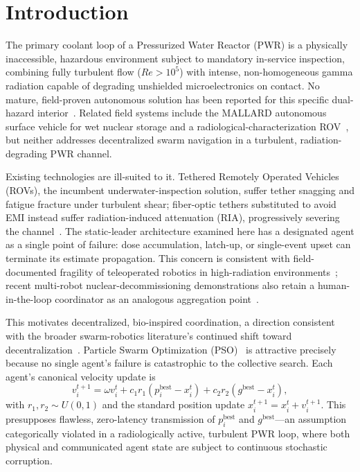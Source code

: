 \documentclass[conference]{IEEEtran}
\begin{document}
\section{Introduction}
\label{sec:intro}

The primary coolant loop of a Pressurized Water Reactor (PWR) is a physically inaccessible, hazardous environment subject to mandatory in-service inspection, combining fully turbulent flow ($Re > 10^5$) with intense, non-homogeneous gamma radiation capable of degrading unshielded microelectronics on contact. No mature, field-proven autonomous solution has been reported for this specific dual-hazard interior~\cite{pwr_inspection}. Related field systems include the MALLARD autonomous surface vehicle for wet nuclear storage and a radiological-characterization ROV~\cite{gros_mallard_2019,nanckevill_2018}, but neither addresses decentralized swarm navigation in a turbulent, radiation-degrading PWR channel.

Existing technologies are ill-suited to it. Tethered Remotely Operated Vehicles (ROVs), the incumbent underwater-inspection solution, suffer tether snagging and fatigue fracture under turbulent shear; fiber-optic tethers substituted to avoid EMI instead suffer radiation-induced attenuation (RIA), progressively severing the channel~\cite{ria_optical}. The static-leader architecture examined here has a designated agent as a single point of failure: dose accumulation, latch-up, or single-event upset can terminate its estimate propagation. This concern is consistent with field-documented fragility of teleoperated robotics in high-radiation environments~\cite{nagatani_fukushima}; recent multi-robot nuclear-decommissioning demonstrations also retain a human-in-the-loop coordinator as an analogous aggregation point~\cite{mitchell_smurf_2023}.

This motivates decentralized, bio-inspired coordination, a direction consistent with the broader swarm-robotics literature's continued shift toward decentralization~\cite{refis_swarm_review_2025}. Particle Swarm Optimization (PSO)~\cite{pso_canonical} is attractive precisely because no single agent's failure is catastrophic to the collective search. Each agent's canonical velocity update is
\begin{equation}
v_i^{t+1} = \omega v_i^{t} + c_1 r_1 \left(p_i^{\text{best}} - x_i^{t}\right) + c_2 r_2 \left(g^{\text{best}} - x_i^{t}\right),
\label{eq:canonical-pso}
\end{equation}
with $r_1, r_2 \sim U(0,1)$ and the standard position update $x_i^{t+1} = x_i^{t} + v_i^{t+1}$. This presupposes flawless, zero-latency transmission of $p_i^{\text{best}}$ and $g^{\text{best}}$---an assumption categorically violated in a radiologically active, turbulent PWR loop, where both physical and communicated agent state are subject to continuous stochastic corruption.
\end{document}
